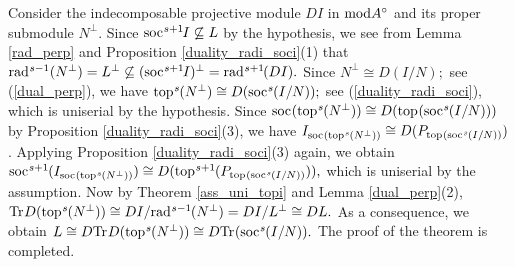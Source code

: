 \documentclass[10pt]{amsart}
\theoremstyle{definition}
\newcommand{\mmod}{{\rm mod}}
\newcommand{\rad}{{\rm rad}\hspace{.5pt}}
\newcommand{\soc}{{\rm soc}\hspace{.5pt}}
\newcommand{\ntop}{{\rm top}\hspace{.5pt}}
\newcommand{\hp}{\hspace{.5pt}}
\begin{document}
Consider the indecomposable projective module $DI$ in $\mmod A^\circ$ and its proper submodule $N^\perp$. Since $\soc^{s+1}\hspace{-1pt} I\not\subseteq L$ by the hypothesis, 
we see from Lemma \ref{rad_perp} and Proposition \ref{duality_radi_soci}(1) that $\rad^{s-1}(N^\perp)=L^\perp\not\subseteq (\soc^{s+1}\hspace{-1pt} I)^\perp=\rad^{s+1}\hspace{-1pt}(DI).$ Since $N^\perp\cong D(I/N);$ see (\ref{dual_perp}), we have $\ntop^s\hspace{-.5pt}(N^\perp) %
\cong D(\soc^s\hspace{-.5pt}(I/N));$ see (\ref{duality_radi_soci}),
which is uniserial by the hypothesis. Since $\soc(\ntop^s\hspace{-.5pt}(N^\perp)) %
\cong D(\ntop(\soc^s\hspace{-.6pt}(I/N)))$ by Proposition \ref{duality_radi_soci}(3), we have 
$I_{\soc(\ntop^s\hspace{-.5pt}(N^\perp))}\cong D(P_{\ntop(\soc^s\hspace{-.5pt}(I/N))})$. Applying Proposition \ref{duality_radi_soci}(3) again, we obtain \vspace{0.5pt}
$\soc^{s+1}\hspace{-.5pt}(I_{\soc(\ntop^s\hspace{-.5pt}(N^\perp))}) 
\cong D(\ntop^{s+1}\hspace{-.5pt}(P_{\ntop(\soc^s\hspace{-.5pt}(I/N))})),\vspace{0.5pt}$
which is uniserial by the assumption. Now by Theorem \ref{ass_uni_topi} and Lemma \ref{dual_perp}(2), ${\rm Tr}\hp D(\ntop^s\hspace{-.5pt}(N^\perp)) \cong  DI/\rad^{s-1}\hspace{-.6pt}(N^\perp)=DI/L^\perp \cong DL.$ As a consequence, we obtain $L\cong D{\rm Tr}\hp D(\ntop^s\hspace{-.5pt}(N^\perp))  \cong D{\rm Tr}\hp (\soc^s\hspace{-.5pt}(I/N)).$ The proof of the theorem is completed. 

\end{document}
